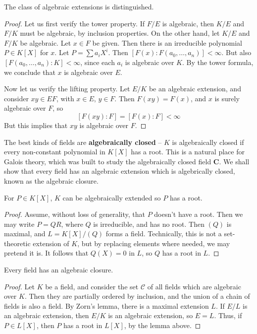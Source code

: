 \begin{theorem}
    The class of algebraic extensions is distinguished.
\end{theorem}
\begin{proof}
    Let us first verify the tower property. If $F/E$ is algebraic, then $K/E$ and $F/K$ must be algebraic, by inclusion properties. On the other hand, let $K/E$ and $F/K$ be algebraic. Let $x \in F$ be given. Then there is an irreducible polynomial $P \in K[X]$ for $x$. Let $P = \sum a_i X^i$. Then $[F(x): F(a_0, \dots, a_n)] < \infty$. But also $[F(a_0, \dots, a_n): K] < \infty$, since each $a_i$ is algebraic over $K$. By the tower formula, we conclude that $x$ is algebraic over $E$.

    Now let us verify the lifting property. Let $E/K$ be an algebraic extension, and consider $xy \in EF$, with $x \in E$, $y \in F$. Then $F(xy) = F(x)$, and $x$ is surely algebraic over $F$, so
    \[ [F(xy) : F] = [F(x): F] < \infty \]
    But this implies that $xy$ is algebraic over $F$.
\end{proof}

The best kinds of fields are {\bf algebraically closed} -- $K$ is algebraically closed if every non-constant polynomial in $K[X]$ has a root. This is a natural place for Galois theory, which was built to study the algebraically closed field $\mathbf{C}$. We shall show that every field has an algebraic extension which is algebrically closed, known as the algebraic closure.

\begin{lemma}
    For $P \in K[X]$, $K$ can be algebraically extended so $P$ has a root.
\end{lemma}
\begin{proof}
    Assume, without loss of generality, that $P$ doesn't have a root. Then we may write $P = QR$, where $Q$ is irreducible, and has no root. Then $(Q)$ is maximal, and $L = K[X]/(Q)$ forms a field. Technically, this is not a set-theoretic extension of $K$, but by replacing elements where needed, we may pretend it is. It follows that $Q(X) = 0$ in $L$, so $Q$ has a root in $L$.
\end{proof}

\begin{theorem}
    Every field has an algebraic closure.
\end{theorem}
\begin{proof}
    Let $K$ be a field, and consider the set $\mathcal{C}$ of all fields which are algebraic over $K$. Then they are partially ordered by inclusion, and the union of a chain of fields is also a field. By Zorn's lemma, there is a maximal extension $L$. If $E/L$ is an algebraic extension, then $E/K$ is an algebraic extension, so $E = L$. Thus, if $P \in L[X]$, then $P$ has a root in $L[X]$, by the lemma above.
\end{proof}

